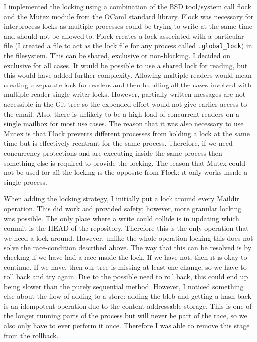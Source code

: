 I implemented the locking using a combination of the BSD tool/system call flock\cite{manual_flock} and the Mutex module from the OCaml standard library. Flock was necessary for interprocess locks as multiple processes could be trying to write at the same time and should not be allowed to. Flock creates a lock associated with a particular file (I created a file to act as the lock file for any process called \texttt{.global\_lock}) in the filesystem. This can be shared, exclusive or non-blocking. I decided on exclusive for all cases. It would be possible to use a shared lock for reading, but this would have added further complexity. Allowing multiple readers would mean creating a separate lock for readers and then handling all the cases involved with multiple reader single writer locks. However, partially written messages are not accessible in the Git tree so the expended effort would not give earlier access to the email. Also, there is unlikely to be a high load of concurrent readers on a single mailbox for most use cases. The reason that it was also necessary to use Mutex is that Flock prevents different processes from holding a lock at the same time but is effectively reentrant for the same process. Therefore, if we need concurrency protections and are executing inside the same process then something else is required to provide the locking. The reason that Mutex could not be used for all the locking is the opposite from Flock: it only works inside a single process.

When adding the locking strategy, I initially put a lock around every Maildir operation. This did work and provided safety; however, more granular locking was possible. The only place where a write could collide is in updating which commit is the HEAD of the repository. Therefore this is the only operation that we need a lock around. However, unlike the whole-operation locking this does not solve the race-condition described above. The way that this can be resolved is by checking if we have had a race inside the lock. If we have not, then it is okay to continue. If we have, then our tree is missing at least one change, so we have to roll back and try again. Due to the possible need to roll back, this could end up being slower than the purely sequential method. However, I noticed something else about the flow of adding to a store: adding the blob and getting a hash back is an idempotent operation due to the content-addressable storage. This is one of the longer running parts of the process but will never be part of the race, so we also only have to ever perform it once. Therefore I was able to remove this stage from the rollback.

